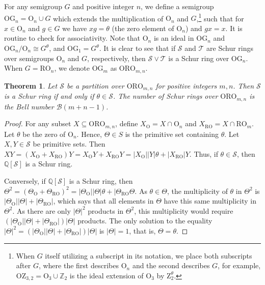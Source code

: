 \documentclass{article}
\theoremstyle{plain}
\newtheorem{Thm}{Theorem}[section]
\theoremstyle{definition}
\renewcommand{\S}{\mathcal{S}}
\newcommand{\T}{\mathcal{T}}
\newcommand{\Q}{\mathbb{Q}}
\newcommand{\Z}{\mathbb{Z}}
\newcommand{\QS}{\Q[\S]}
\newcommand{\B}{\mathscr{B}}
\renewcommand{\O}{\mathrm{O}}
\newcommand{\RO}{\mathrm{RO}}
\newcommand{\ORO}{\mathrm{ORO}}
\newcommand{\z}{\mathrm{Z}}
\newcommand{\OZ}{\mathrm{OZ}}
\newcommand{\OG}{\mathrm{OG}}
\begin{document}
For any semigroup $G$ and positive integer $n$, we define a semigroup \label{og}$\OG_n = \O_n\cup G$ which extends the multiplication of $\O_n$ and $G$,\footnote{When $G$ itself utilizing a subscript in its notation, we place both subscripts after $G$, where the first describes $\O_n$ and the second describes $G$, for example, \label{oz2}$\OZ_{3,2} = \O_3\cup \Z_2$ is the ideal extension of $\O_3$ by $\z_2^\theta$.} such that for $x\in \O_n$ and $g\in G$ we have $xg=\theta$ (the zero element of $\O_n$) and $gx=x$. It is routine to check for associativity. Note that $\O_n$ is an ideal in $\OG_n$ and $\OG_n/\O_n \cong G^\theta$, and $\OG_1=G^\theta$. It is clear to see that if $\S$ and $\T$ are Schur rings over semigroups $\O_n$ and $G$, respectively, then $\S\vee \T$ is a Schur ring over $\OG_n$. 
When \label{oro}$G=\RO_n$, we denote $\OG_m$ as $\ORO_{m,n}$.%

\begin{Thm}\label{thm:oro} Let $\S$ be a partition over $\ORO_{m,n}$ for positive integers $m,n$. Then $\S$ is a Schur ring if and only if $\theta\in \S$. The number of Schur rings over $\ORO_{m,n}$ is the Bell number $\B(m+n-1)$.
\end{Thm}
\begin{proof}
    For any subset $X\subseteq \ORO_{m,n}$, define $X_\O = X\cap \O_n$ and $X_\RO=X\cap \RO_m$. Let $\theta$ be the zero of $\O_n$. Hence, $\Theta\in S$ is the primitive set containing $\theta$. Let $X, Y\in \S$ be primitive sets. Then $XY = (X_\O+X_\RO)Y = X_\O Y + X_\RO Y = |X_\O||Y|\theta + |X_\RO|Y$. Thus, if $\theta\in \S$, then $\QS$ is a Schur ring. 
    
    Conversely, if $\QS$ is a Schur ring, then $\Theta^2 = (\Theta_\O+\Theta_\RO)^2 = |\Theta_\O||\Theta|\theta + |\Theta_\RO\Theta$. As $\theta\in \Theta$, the multiplicity of $\theta$ in $\Theta^2$ is $|\Theta_\O||\Theta|+|\Theta_\RO|$, which says that all elements in $\Theta$ have this same multiplicity in $\Theta^2$. As there are only $|\Theta|^2$ products in $\Theta^2$, this multiplicity would require $(|\Theta_\O||\Theta|+|\Theta_\RO|)|\Theta|$ products. The only solution to the equality $|\Theta|^2=(|\Theta_\O||\Theta|+|\Theta_\RO|)|\Theta|$ is $|\Theta|=1$, that is, $\Theta = \theta$.
\end{proof}
 
\end{document}
